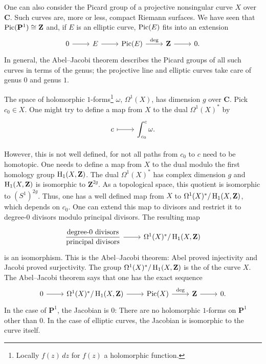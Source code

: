 \documentclass [11 pt, oneside] {article}
\begin{document}
One can also consider the Picard group of a projective nonsingular curve $X$ over $\mathbf{C}$. Such curves are, more or less, compact Riemann surfaces. We have seen that $\operatorname{Pic} (\mathbf{P}^1)\cong \mathbf{Z}$ and, if $E$ is an elliptic curve, $\operatorname{Pic}(E)$ fits into an extension
\[
\begin{tikzcd}
	0\ar[r] & E\ar[r]&\Pic(E)\ar[r,"\deg"] & \mathbf{Z}\ar[r]&0.
\end{tikzcd}
\]
In general, the Abel--Jacobi theorem describes the Picard groups of all such curves in terms of the genus; the projective line and elliptic curves take care of genus $0$ and genus $1$.

The space of holomorphic $1$-forms\footnote{Locally $f(z)\,dz$ for $f(z)$ a holomorphic function.} $\omega$, $\Omega^1(X)$, has dimension $g$ over $\mathbf{C}$. Pick $c_0\in X$. One might try to define a map from $X$ to the dual $\Omega^1(X)^*$ by
\[
\begin{tikzcd}
	c\ar[r,mapsto]& \displaystyle\int_{c_0}^{c} \omega.
\end{tikzcd}
\]

However, this is not well defined, for not all paths from $c_0$ to $c$ need to be homotopic. 
One needs to define a map from $X$ to the dual modulo the first homology group $\operatorname{H}_1(X,\mathbf{Z})$.
The dual $\Omega^1(X)^*$ has complex dimension $g$ and $\operatorname{H}_1(X,\mathbf{Z})$ is isomorphic to $\mathbf{Z}^{2g}$. As a topological space, this quotient is isomorphic to $(S^1)^{2g}$.
Thus, one has a well defined map from $X$ to $\Omega^1(X)^*/\operatorname{H}_1 (X,\mathbf{Z})$, which depends on $c_0$. One can extend this map to divisors and restrict it to degree-$0$ divisors modulo principal divisors. The resulting map
\[
\begin{tikzcd}
	\displaystyle \frac{\textrm{degree-$0$ divisors}}{\textrm{principal divisors}} \ar[r] & \Omega^1(X)^*/\HH_1 (X,\mathbf{Z})
\end{tikzcd}
\]
is an isomorphism. This is the Abel--Jacobi theorem: Abel proved injectivity and Jacobi proved surjectivity. The group $\Omega^1(X)^*/\operatorname{H}_1(X,\mathbf{Z})$ is the  of the curve $X$.
The Abel--Jacobi theorem says that one has the exact sequence
\[
\begin{tikzcd}
	0\ar[r]& \Omega^1(X)^*/\HH_1(X,\mathbf{Z}) \ar[r]&\Pic(X)\ar[r,"\deg"] &\mathbf{Z}\ar[r]&0.
\end{tikzcd}
\]
In the case of $\mathbf{P}^1$, the Jacobian is $0$: There are no holomorphic $1$-forms on $\mathbf{P}^1$ other than $0$. In the case of elliptic curves, the Jacobian is isomorphic to the curve itself.
\end{document}
